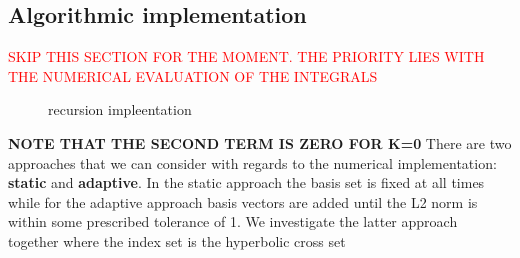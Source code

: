 \subsection{Algorithmic implementation}
\textcolor{red}{SKIP THIS SECTION FOR THE MOMENT. THE PRIORITY LIES WITH 
THE NUMERICAL EVALUATION OF THE INTEGRALS}
\begin{figure}[h!]
    \centering
    \caption{recursion impleentation}
    \label{fig:recursion-impleentation}
\end{figure}
\textbf{NOTE THAT THE SECOND TERM IS ZERO FOR K=0}
There are two approaches that we can consider with regards 
to the numerical implementation: \textbf{static} and \textbf{adaptive}.
In the static approach the basis set is fixed at all times while for the 
adaptive approach basis vectors are added until the L2 norm is within some 
prescribed tolerance of 1. We investigate the latter approach together 
where the index set is the hyperbolic cross set 
